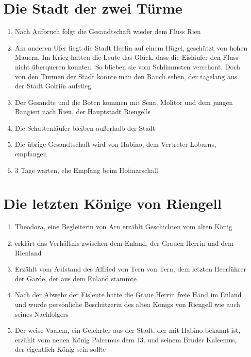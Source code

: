 \documentclass[12pt,a4paper,onecolumn,oneside,ngerman]{book}
\newcommand{\Tern}{Tern}
\newcommand{\Molitor}{Molitor}
\newcommand{\Sena}{Sena}
\newcommand{\Bangiri}{Bangieri}
\newcommand{\Arwed}{Alfried von \Tern}
\newcommand{\Enland}{Enland}
\newcommand{\Schattenlaufer}{Schattenläufer}
\newcommand{\Lobarn}{Lobarn}
\newcommand{\Arn}{Arn}
\newcommand{\Eislaufer}{Eisläufer}
\newcommand{\Eisleute}{Eisleute}
\newcommand{\Theodora}{Theodora}
\newcommand{\Rhinland}{Rienland}
\newcommand{\Rhingell}{Riengell}
\newcommand{\Helin}{Heelin}
\newcommand{\Golrin}{Golriin}
\newcommand{\Rhin}{Rien}
\newcommand{\Habino}{Habino}
\newcommand{\Valem}{Vaalem}
\newcommand{\Palemus}{Paleemus}
\newcommand{\Kalemus}{Kaleemus}
\begin{document}
\chapter[Die Stadt der zwei Türme]{Die Stadt der zwei Türme}
\begin{enumerate}
  \item Nach Aufbruch folgt die Gesandtschaft wieder dem Fluss {\Rhin}
  \item Am anderen Ufer liegt die Stadt {\Helin} auf einem Hügel, geschützt von hohen Mauern. Im Krieg hatten die Leute das Glück, dass die {\Eislaufer} den Fluss nicht überqueren konnten. So blieben sie vom Schlimmsten verschont. Doch von den Türmen der Stadt konnte man den Rauch sehen, der tagelang aus der Stadt {\Golrin} aufstieg
  \item Der Gesandte und die Boten kommen mit {\Sena}, {\Molitor} und  dem jungen {\Bangiri} nach {\Rhin}, der Hauptstadt \Rhingell{s}
  \item Die {\Schattenlaufer} bleiben außerhalb der Stadt
  \item Die übrige Gesandtschaft wird von {\Habino}, dem Vertreter {\Lobarn}s, empfangen
  \item 3 Tage warten, ehe Empfang beim Hofmarschall
\end{enumerate}

\chapter[Die Geschichte des Königshauses]{Die letzten Könige von {\Rhingell}}
\begin{enumerate}
  \item {\Theodora}, eine Begleiterin von {\Arn} erzählt Geschichten vom alten König
  \item erklärt das Verhältnis zwischen dem {\Enland}, der Grauen Herrin und dem {\Rhinland}
  \item Erzählt vom Aufstand des {\Arwed} von {\Tern}, dem letzten Heerführer der Garde, der aus dem {\Enland} stammte
  \item Nach der Abwehr der {\Eisleute} hatte die Graue Herrin freie Hand im {\Enland} und wurde persönliche Beschützerin des alten Königs von {\Rhingell} wie auch seines Nachfolgers
  \item Der weise {\Valem}, ein Gelehrter aus der Stadt, der mit {\Habino} bekannt ist, erzählt vom neuen König {\Palemus} dem 13. und seinem Bruder {\Kalemus}, der eigentlich König sein sollte
\end{enumerate}
\end{document}
